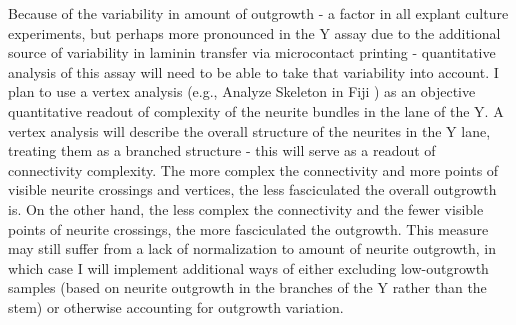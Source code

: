 Because of the variability in amount of outgrowth - a factor in all explant culture experiments, but perhaps more pronounced in the Y assay due to the additional source of variability in laminin transfer via microcontact printing - quantitative analysis of this assay will need to be able to take that variability into account.
I plan to use a vertex analysis (e.g., Analyze Skeleton in Fiji \cite{arganda20103d}) as an objective quantitative readout of complexity of the neurite bundles in the lane of the Y.
A vertex analysis will describe the overall structure of the neurites in the Y lane, treating them as a branched structure - this will serve as a readout of connectivity complexity.
The more complex the connectivity and more points of visible neurite crossings and vertices, the less fasciculated the overall outgrowth is.
On the other hand, the less complex the connectivity and the fewer visible points of neurite crossings, the more fasciculated the outgrowth.
This measure may still suffer from a lack of normalization to amount of neurite outgrowth, in which case I will implement additional ways of either excluding low-outgrowth samples (based on neurite outgrowth in the branches of the Y rather than the stem) or otherwise accounting for outgrowth variation.
%
%
%

